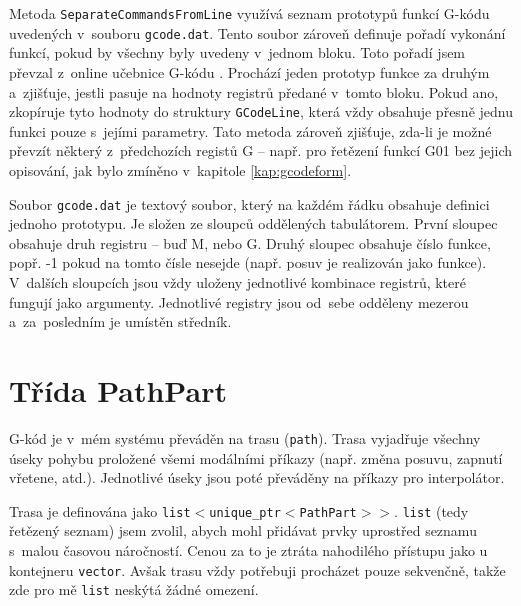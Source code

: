 		Metoda {\tt SeparateCommandsFromLine} využívá seznam prototypů funkcí G-kódu uvedených v~souboru {\tt gcode.dat}. Tento soubor zároveň definuje pořadí vykonání funkcí, pokud by všechny byly uvedeny v~jednom bloku. Toto pořadí jsem převzal z~online učebnice G-kódu \cite{gcode2}. Prochází jeden prototyp funkce za druhým a~zjišťuje, jestli pasuje na hodnoty registrů předané v~tomto bloku. Pokud ano, zkopíruje tyto hodnoty do struktury {\tt GCodeLine}, která vždy obsahuje přesně jednu funkci pouze s~jejími parametry. Tato metoda zároveň zjišťuje, zda-li je možné převzít některý z~předchozích registů G -- např. pro řetězení funkcí G01 bez jejich opisování, jak bylo zmíněno v~kapitole \ref{kap:gcodeform}.
		
		Soubor {\tt gcode.dat} je textový soubor, který na každém řádku obsahuje definici jednoho prototypu. Je složen ze sloupců oddělených tabulátorem. První sloupec obsahuje druh registru -- buď M, nebo G. Druhý sloupec obsahuje číslo funkce, popř. -1 pokud na tomto čísle nesejde (např. posuv je realizován jako funkce). V~dalších sloupcích jsou vždy uloženy jednotlivé kombinace registrů, které fungují jako argumenty. Jednotlivé registry jsou od~sebe odděleny mezerou a~za~posledním je umístěn středník.
		
	\section{Třída PathPart}
		G-kód je v~mém systému převáděn na trasu ({\tt path}). Trasa vyjadřuje všechny úseky pohybu proložené všemi modálními příkazy (např. změna posuvu, zapnutí vřetene, atd.). Jednotlivé úseky jsou poté převáděny na příkazy pro interpolátor.
		
		Trasa je definována jako {\tt list$<$unique\_ptr$<$PathPart$>>$}. {\tt list} (tedy řetězený seznam) jsem zvolil, abych mohl přidávat prvky uprostřed seznamu s~malou časovou náročností. Cenou za to je ztráta nahodilého přístupu jako u kontejneru {\tt vector}. Avšak trasu vždy potřebuji procházet pouze sekvenčně, takže zde pro mě {\tt list} neskýtá žádné omezení.
		
